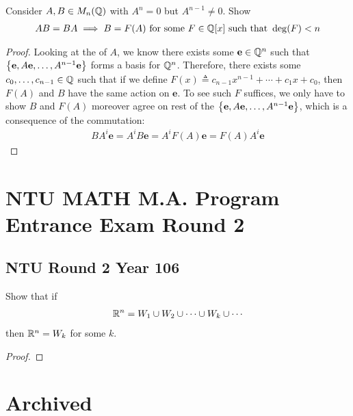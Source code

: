 \documentclass{report}
\begin{document}
\begin{question}{}{}
Consider $A,B\in M_n(\mathbb{Q})$ with $A^n=0$ but  $A^{n-1}\neq 0$. Show 
\begin{align*}
AB=BA \implies  B= F(A)\text{ for some }F \in \mathbb{Q}[x]\text{ such that }\operatorname{deg}(F)<n
\end{align*}
\end{question}
\begin{proof}
Looking at the  of $A$, we know there exists some  $\textbf{e}\in\mathbb{Q}^n$ such that $\left\{ \textbf{e},A\textbf{e},\dots , A^{n-1}\textbf{e} \right\}$ forms a basis for $\mathbb{Q}^n$. Therefore, there exists some $c_0,\dots ,c_{n-1}\in\mathbb{Q}$  such that if we define  $F(x)\triangleq c_{n-1}x^{n-1}+ \cdots + c_1x+c_0$, then $F(A)$ and $B$ have the same action on  $\textbf{e}$. To see such $F$ suffices, we only have to show  $B$ and  $F(A)$ moreover agree on rest of the $\left\{ \textbf{e},A\textbf{e},\dots , A^{n-1}\textbf{e} \right\}$, which is a consequence of the commutation: 
\begin{align*}
BA^i\textbf{e}= A^iB\textbf{e}=A^i F(A)\textbf{e}= F(A)A^i \textbf{e}
\end{align*}
\end{proof}
\chapter{NTU MATH M.A. Program Entrance Exam Round 2}
\section{NTU Round 2 Year 106}
\begin{question}{}{}
Show that if 
 \begin{align*}
\mathbb{R}^n = W_1 \cup W_2 \cup  \cdots \cup  W_k \cup  \cdots  
\end{align*}
then $\mathbb{R}^n=W_k$ for some $k$. 
\end{question}
\begin{proof}

\end{proof}
\chapter{Archived}
\end{document}
